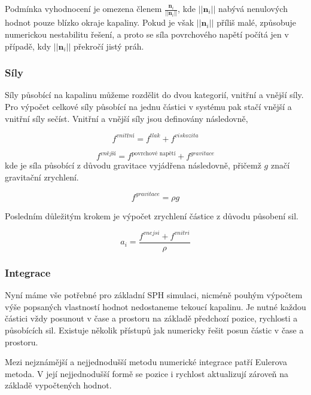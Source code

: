 Podmínka vyhodnocení je omezena členem $\frac{\mathbf{n}_i}{||\mathbf{n}_i||}$, kde $||\mathbf{n}_i||$ nabývá nenulových hodnot pouze blízko okraje kapaliny. Pokud je však $||\mathbf{n}_i||$ příliš malé, způsobuje numerickou nestabilitu řešení, a proto se síla povrchového napětí počítá jen v případě, kdy $||\mathbf{n}_i||$ překročí jistý práh.


\subsubsection{Síly}
Síly působící na kapalinu můžeme rozdělit do dvou kategorií, vnitřní a vnější síly. Pro výpočet celkové síly působící na jednu částici v systému pak stačí vnější a vnitřní síly sečíst. Vnitřní a vnější síly jsou definovány následovně, \cite{KelagerSPH}

\begin{equation}
    f^{vnitřní} = f^{tlak} + f^{viskozita}
    \label{eq:ForceInt}
\end{equation}

\begin{equation}
    f^{vnější} = f^{\text{povrchové napětí}} + f^{gravitace}
    \label{eq:ForceExt}
\end{equation}
kde je síla působící z důvodu gravitace vyjádřena následovně, přičemž $g$ značí gravitační zrychlení.

\begin{equation}
    f^{gravitace} = \rho g
\end{equation}

Posledním důležitým krokem je výpočet zrychlení částice z důvodu působení sil.

\begin{equation}
    a_i = \frac{f^{vnejsi} + f^{vnitri}}{\rho}
    \label{eq:Acc}
\end{equation}

\subsubsection{Integrace}
Nyní máme vše potřebné pro základní SPH simulaci, nicméně pouhým výpočtem výše popsaných vlastností hodnot nedostaneme tekoucí kapalinu. Je nutné každou částici vždy posunout v čase a prostoru na základě předchozí pozice, rychlosti a působících sil. Existuje několik přístupů jak numericky řešit posun částic v čase a prostoru.

Mezi nejznámější a nejjednodušší metodu numerické integrace patří Eulerova metoda. V její nejjednodušší formě se pozice i rychlost aktualizují zároveň na základě vypočtených hodnot.


